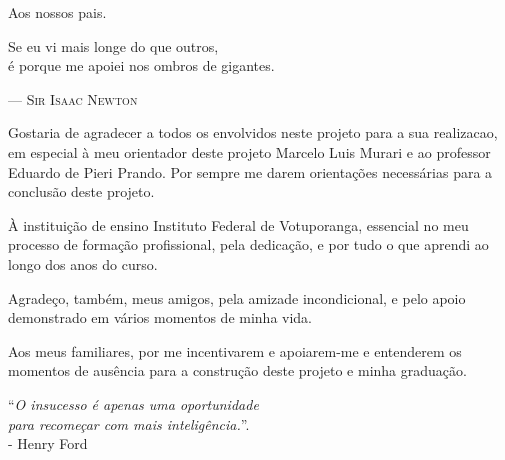 \documentclass[12pt,english,brazilian]{UNISINOSmonografia}
\begin{document}
\capa
\folhaderosto

%
\begin{dedicatoria}
Aos nossos pais.\\[4ex] %
\begin{itshape} %
Se eu vi mais longe do que outros,\\
é porque me apoiei nos ombros de gigantes.\\
\end{itshape}
--- \textsc{Sir Isaac Newton} %
\end{dedicatoria}

\begin{agradecimentos}
Gostaria de agradecer a todos os envolvidos neste projeto para a sua realizacao, em especial à meu orientador deste projeto Marcelo Luis Murari e ao professor Eduardo de Pieri Prando. Por sempre me darem orientações necessárias para a conclusão deste projeto.

À instituição de ensino Instituto Federal de Votuporanga, essencial no meu processo de formação profissional, pela dedicação, e por tudo o que aprendi ao longo dos anos do curso.

Agradeço, também, meus amigos, pela amizade incondicional, e pelo apoio demonstrado em vários momentos de minha vida.

Aos meus familiares, por me incentivarem e apoiarem-me e entenderem os momentos de ausência para a construção deste projeto e minha graduação.
\end{agradecimentos}

%
\begin{epigrafe}
``\textit{O insucesso é apenas uma oportunidade \\
para recomeçar com mais inteligência.}''.\\
- Henry Ford
\end{epigrafe}
\end{document}
